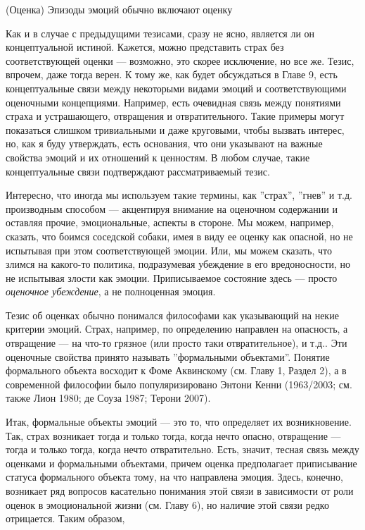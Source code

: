 \documentclass[11pt]{book}
\begin{document}
\smallskip

(Оценка) Эпизоды эмоций обычно включают оценку

\smallskip

Как и в случае с предыдущими тезисами, сразу не ясно, является ли он концептуальной истиной. Кажется, можно представить страх без соответствующей оценки --- возможно, это скорее исключение, но все же. Тезис, впрочем, даже тогда верен. К тому же, как будет обсуждаться в Главе 9, есть концептуальные связи между некоторыми видами эмоций и соответствующими оценочными концепциями. Например, есть очевидная связь между понятиями страха и устрашающего, отвращения и отвратительного. Такие примеры могут показаться слишком тривиальными и даже круговыми, чтобы вызвать интерес, но, как я буду утверждать, есть основания, что они указывают на важные свойства эмоций и их отношений к ценностям. В любом случае, такие концептуальные связи подтверждают рассматриваемый тезис.

Интересно, что иногда мы используем такие термины, как ''страх'', ''гнев'' и т.д. производным способом --- акцентируя внимание на оценочном содержании и оставляя прочие, эмоциональные, аспекты в стороне. Мы можем, например, сказать, что боимся соседской собаки, имея в виду ее оценку как опасной, но не испытывая при этом соответствующей эмоции. Или, мы можем сказать, что злимся на какого-то политика, подразумевая убеждение в его вредоносности, но не испытывая злости как эмоции. Приписываемое состояние здесь --- просто \textit{оценочное убеждение}, а не полноценная эмоция.

Тезис об оценках обычно понимался философами как указывающий на некие критерии эмоций. Страх, например, по определению направлен на опасность, а отвращение --- на что-то грязное (или просто таки отвратительное), и т.д.. Эти оценочные свойства принято называть ''формальными объектами''. Понятие формального объекта восходит к Фоме Аквинскому (см. Главу 1, Раздел 2), а в современной философии было популяризировано Энтони Кенни (1963/2003; см. также Лион 1980; де Соуза 1987; Терони 2007).

Итак, формальные объекты эмоций --- это то, что определяет их возникновение. Так, страх возникает тогда и только тогда, когда нечто опасно, отвращение --- тогда и только тогда, когда нечто отвратительно. Есть, значит, тесная связь между оценками и формальными объектами, причем оценка предполагает приписывание статуса формального объекта тому, на что направлена эмоция. Здесь, конечно, возникает ряд вопросов касательно понимания этой связи в зависимости от роли оценок в эмоциональной жизни (см. Главу 6), но наличие этой связи редко отрицается. Таким образом,
\end{document}
